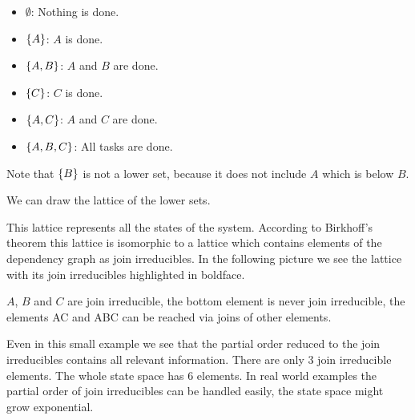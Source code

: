 \begin{itemize}
    \item $\emptyset$: Nothing is done.

    \item $\left\{A\right\}$: $A$ is done.

    \item $\left\{A,B\right\}$: $A$ and $B$ are done.

    \item $\left\{C\right\}$: $C$ is done.

    \item $\left\{A,C\right\}$: $A$ and $C$ are done.

    \item $\left\{A,B,C\right\}$: All tasks are done.
\end{itemize}

Note that $\left\{B\right\}$ is not a lower set, because it does not include $A$ which is
below $B$.

We can draw the lattice of the lower sets.


\noindent This lattice represents all the states of the system. According to
Birkhoff's theorem this lattice is isomorphic to a lattice which contains
elements of the dependency graph as join irreducibles. In the following picture
we see the lattice with its join irreducibles highlighted in boldface.


\noindent $A$, $B$ and $C$ are join irreducible, the bottom element is never
join irreducible, the elements AC and ABC can be reached via joins of other
elements.

Even in this small example we see that the partial order reduced to the join
irreducibles contains all relevant information. There are only 3 join
irreducible elements. The whole state space has 6 elements. In real world
examples the partial order of join irreducibles can be handled easily, the state
space might grow exponential.
